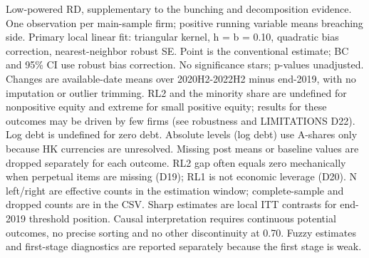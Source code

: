 \begin{table}[!htbp]
\centering\small
\caption{Supplementary RL1 sharp regression discontinuity (ITT): primary fixed bandwidth}
\label{tab:t024_rd_main}
\par\smallskip
\begin{minipage}{\linewidth}\footnotesize
Low-powered RD, supplementary to the bunching and decomposition evidence. One observation per main-sample firm; positive running variable means breaching side. Primary local linear fit: triangular kernel, h = b = 0.10, quadratic bias correction, nearest-neighbor robust SE. Point is the conventional estimate; BC and 95\% CI use robust bias correction. No significance stars; p-values unadjusted. Changes are available-date means over 2020H2-2022H2 minus end-2019, with no imputation or outlier trimming. RL2 and the minority share are undefined for nonpositive equity and extreme for small positive equity; results for these outcomes may be driven by few firms (see robustness and LIMITATIONS D22). Log debt is undefined for zero debt. Absolute levels (log debt) use A-shares only because HK currencies are unresolved. Missing post means or baseline values are dropped separately for each outcome. RL2 gap often equals zero mechanically when perpetual items are missing (D19); RL1 is not economic leverage (D20). N left/right are effective counts in the estimation window; complete-sample and dropped counts are in the CSV. Sharp estimates are local ITT contrasts for end-2019 threshold position. Causal interpretation requires continuous potential outcomes, no precise sorting and no other discontinuity at 0.70. Fuzzy estimates and first-stage diagnostics are reported separately because the first stage is weak.
\end{minipage}
\end{table}
